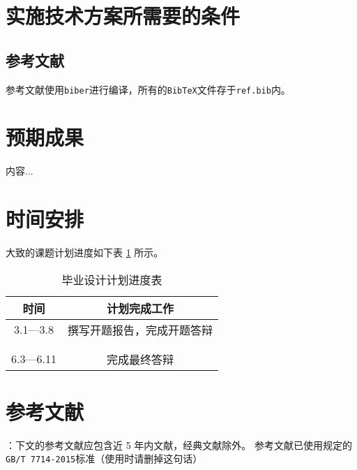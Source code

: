 \documentclass[UTF8,AutoFakeBold,AutoFakeSlant,zihao=-4]{ctexart}
\numberwithin{equation}{section}
\numberwithin{equation}{section}
\begin{document}
\newpage
\section{实施技术方案所需要的条件}
\setcounter{figure}{0}
\setcounter{table}{0}
\setlength{\baselineskip}{22pt}
\begin{ubox}
\subsection{参考文献}

参考文献使用\texttt{biber}进行编译，所有的\texttt{BibTeX}文件存于\texttt{ref.bib}内。
\subsection{}
\end{ubox}

\newpage
\section{预期成果}
\setcounter{figure}{0}
\setcounter{table}{0}
\setlength{\baselineskip}{22pt}
\begin{ubox}
	内容...
\end{ubox}

\newpage
\section{时间安排}
\setcounter{figure}{0}
\setcounter{table}{0}
\setlength{\baselineskip}{22pt}
\begin{ubox}
大致的课题计划进度如下表 \ref{tab:progress} 所示。

\renewcommand*\arraystretch{1.5} 
\begin{table}[H]
  \centering
  \caption{毕业设计计划进度表}
  \label{tab:progress}
  \begin{tabular}{@{}cc@{}}
    \toprule
    时间 & 计划完成工作       \\ \midrule
    3.1—3.8 & 撰写开题报告，完成开题答辩 \\\hline
    & \\\hline
    & \\\hline
    6.3—6.11 & 完成最终答辩\\\bottomrule
  \end{tabular}

\end{table}

\end{ubox}

\newpage
\section{参考文献}
\begin{ubox}
：下文的参考文献应包含近 5 年内文献，经典文献除外。 参考文献已使用规定的\texttt{GB/T 7714-2015}标准（使用时请删掉这句话）
\printbibliography[heading=none]
\end{ubox}
\end{document}
